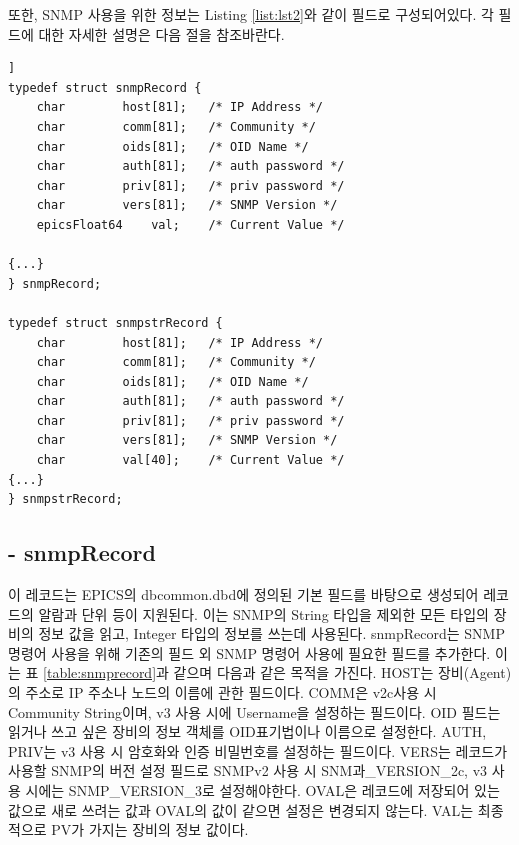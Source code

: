 \documentclass[11pt
  , a4paper
  , article
  , oneside
]{memoir}
\begin{document}
또한, SNMP 사용을 위한 정보는 Listing \ref{list:lst2}와 같이 필드로 구성되어있다. 각 필드에 대한 자세한 설명은 다음 절을 참조바란다.
\begin{lstlisting}[style=termstyle, escapechar=^, caption=snmp·snmpstr 레코드의 일부, label={list:lst2}]]
typedef struct snmpRecord {
	char		host[81];	/* IP Address */
	char		comm[81];	/* Community */
	char		oids[81];	/* OID Name */
	char		auth[81];	/* auth password */
	char		priv[81];	/* priv password */
	char		vers[81];	/* SNMP Version */
	epicsFloat64	val;	/* Current Value */

{...}
} snmpRecord;

typedef struct snmpstrRecord {
	char		host[81];	/* IP Address */
	char		comm[81];	/* Community */
	char		oids[81];	/* OID Name */
	char		auth[81];	/* auth password */
	char		priv[81];	/* priv password */
	char		vers[81];	/* SNMP Version */
	char		val[40];	/* Current Value */
{...}
} snmpstrRecord;
\end{lstlisting}

\subsection{- snmpRecord}
이 레코드는 EPICS의 dbcommon.dbd에 정의된 기본 필드를 바탕으로 생성되어 레코드의 알람과 단위 등이 지원된다. 이는 SNMP의 String 타입을 제외한 모든 타입의 장비의 정보 값을 읽고, Integer 타입의 정보를 쓰는데 사용된다. snmpRecord는 SNMP 명령어 사용을 위해 기존의 필드 외 SNMP 명령어 사용에 필요한 필드를 추가한다. 이는 표 \ref{table:snmprecord}과 같으며 다음과 같은 목적을 가진다. HOST는 장비(Agent)의 주소로 IP 주소나 노드의 이름에 관한 필드이다. COMM은 v2c사용 시 Community String이며, v3 사용 시에 Username을 설정하는 필드이다. OID 필드는 읽거나 쓰고 싶은 장비의 정보 객체를 OID표기법이나 이름으로 설정한다. AUTH, PRIV는 v3 사용 시 암호화와 인증 비밀번호를 설정하는 필드이다. VERS는 레코드가 사용할 SNMP의 버전 설정 필드로 SNMPv2 사용 시 SNM과\_VERSION\_2c, v3 사용 시에는 SNMP\_VERSION\_3로 설정해야한다. OVAL은 레코드에 저장되어 있는 값으로 새로 쓰려는 값과 OVAL의 값이 같으면 설정은 변경되지 않는다. VAL는 최종적으로 PV가 가지는 장비의 정보 값이다.
\end{document}
